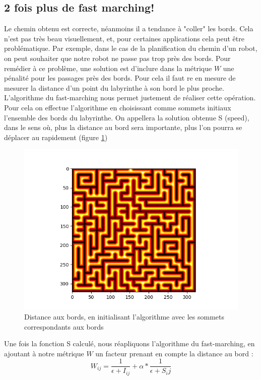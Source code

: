 \documentclass{article}
\begin{document}
\subsection{2 fois plus de fast marching!}
Le chemin obtenu est correcte, néanmoins il a tendance à "coller" les bords. Cela n'est pas très beau visuellement, et, pour certaines applications cela peut être problématique. Par exemple, dans le cas de la planification du chemin d'un robot, on peut souhaiter  que notre robot ne passe pas trop près des bords. Pour remédier à ce problème, une solution est d'inclure dans la métrique $W$ une pénalité pour les passages près des bords. Pour cela il faut re en mesure de mesurer la distance d'un point du labyrinthe à son bord le plus proche. L'algorithme du fast-marching nous permet justement de réaliser cette opération. Pour cela on effectue l'algorithme en choisissant comme sommets initiaux l'ensemble des bords du labyrinthe. On appellera la solution obtenue S (speed), dans le sens où, plus la distance au bord sera importante, plus l'on pourra se déplacer au rapidement (figure \ref{fig:Sfm2}) 

\begin{figure}[h]
	\centering
	\includegraphics[scale=0.7]{../result/maze_S.png}
	\caption{Distance aux bords, en initialisant l'algorithme avec les sommets correspondants aux bords}
	\label{fig:Sfm2}
\end{figure}

Une fois la fonction S calculé, nous réapliquons l'algorithme du fast-marching, en ajoutant à notre métrique $W$ un facteur prenant en compte la distance au bord :
\begin{equation}
W_{ij} = \frac{1}{\epsilon+I_{ij}} + \alpha*\frac{1}{\epsilon+S_ij}
\end{equation}
\end{document}
